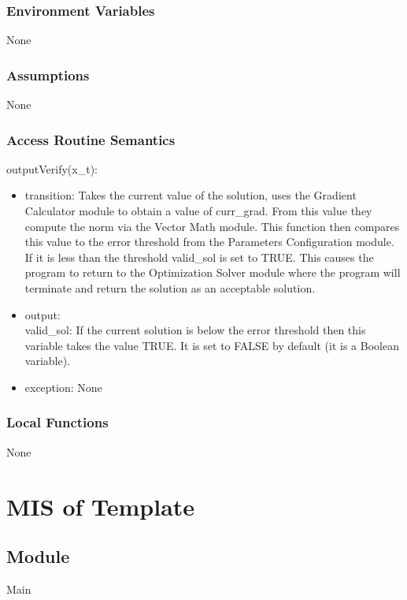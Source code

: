 \documentclass[12pt, titlepage]{article}
\begin{document}
\subsubsection{Environment Variables}

None

\subsubsection{Assumptions}

None

\subsubsection{Access Routine Semantics}

\noindent outputVerify(x\_t):
\begin{itemize}
\item transition: Takes the current value of the solution, uses the Gradient Calculator module to obtain a value of curr\_grad. From this value they compute the norm via the Vector Math module. This function then compares this value to the error threshold from the Parameters Configuration module. If it is less than the threshold valid\_sol is set to TRUE. This causes the program to return to the Optimization Solver module where the program will terminate and return the solution as an acceptable solution.
\item output: 
\\
valid\_sol: If the current solution is below the error threshold then this variable takes the value TRUE. It is set to FALSE by default (it is a Boolean variable).
\item exception: None 
\end{itemize}


\subsubsection{Local Functions}

None


\iffalse 
\section{MIS of Template} \label{Module:OutputParam}

\subsection{Module}
Main
\end{document}
